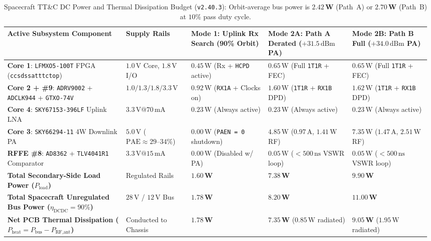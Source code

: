 \documentclass[10pt,a4paper]{article}
\renewcommand{\_}{\origunderscore\penalty0\hskip0pt\relax}
\numberwithin{equation}{section}
\numberwithin{table}{section}
\numberwithin{figure}{section}
\begin{document}
\begin{table}[htbp]
\centering
\scriptsize
\renewcommand{\arraystretch}{1.14}
\begin{tabularx}{\textwidth}{@{}L{0.27\textwidth} L{0.15\textwidth} L{0.17\textwidth} L{0.17\textwidth} Y@{}}
  \toprule
  \textbf{Active Subsystem Component} & \textbf{Supply Rails} & \textbf{Mode 1: Uplink Rx Search (90\% Orbit)} & \textbf{Mode 2A: Path A Derated ($+31.5\,\text{dBm}$ PA)} & \textbf{Mode 2B: Path B Full ($+34.0\,\text{dBm}$ PA)} \\
  \midrule
  \textbf{Core 1}: \texttt{LFMXO5-100T} FPGA (\texttt{ccsds\_sat\_ttc\_top}) & $1.0\,\text{V}$ Core, $1.8\,\text{V}$ I/O & $0.45\,\text{W}$ (Rx + \texttt{HCPD} active) & $0.65\,\text{W}$ (Full \texttt{1T1R} + FEC) & $0.65\,\text{W}$ (Full \texttt{1T1R} + FEC) \\
  \textbf{Core 2 + \#9}: \texttt{ADRV9002} + \texttt{ADCLK944} + \texttt{GTXO-74V} & $1.0 / 1.3 / 1.8 / 3.3\,\text{V}$ & $0.92\,\text{W}$ (\texttt{RX1A} + Clocks on) & $1.60\,\text{W}$ (\texttt{1T1R} + \texttt{RX1B} DPD) & $1.62\,\text{W}$ (\texttt{1T1R} + \texttt{RX1B} DPD) \\
  \textbf{Core 4}: \texttt{SKY67153-396LF} Uplink LNA & $3.3\,\text{V} @ 70\,\text{mA}$ & $0.23\,\text{W}$ (Always active) & $0.23\,\text{W}$ (Always active) & $0.23\,\text{W}$ (Always active) \\
  \textbf{Core 3}: \texttt{SKY66294-11} 4W Downlink PA & $5.0\,\text{V}$ ($\text{PAE} \approx 29\text{--}34\%$) & $0.00\,\text{W}$ (\texttt{PAEN = 0} shutdown) & $4.85\,\text{W}$ ($0.97\,\text{A}$, $1.41\,\text{W}$ RF) & $7.35\,\text{W}$ ($1.47\,\text{A}$, $2.51\,\text{W}$ RF) \\
  \textbf{RFFE \#8}: \texttt{AD8362} + \texttt{TLV4041R1} Comparator & $3.3\,\text{V} @ 15\,\text{mA}$ & $0.00\,\text{W}$ (Disabled w/ PA) & $0.05\,\text{W}$ ($<500\,\text{ns}$ VSWR loop) & $0.05\,\text{W}$ ($<500\,\text{ns}$ VSWR loop) \\
  \midrule
  \textbf{Total Secondary-Side Load Power ($P_{\text{load}}$)} & Regulated Rails & $\mathbf{1.60\,\text{W}}$ & $\mathbf{7.38\,\text{W}}$ & $\mathbf{9.90\,\text{W}}$ \\
  \textbf{Total Spacecraft Unregulated Bus Power ($\eta_{\text{DCDC}}=90\%$)} & $28\,\text{V}$ / $12\,\text{V}$ Bus & $\mathbf{1.78\,\text{W}}$ & $\mathbf{8.20\,\text{W}}$ & $\mathbf{11.00\,\text{W}}$ \\
  \textbf{Net PCB Thermal Dissipation ($P_{\text{heat}} = P_{\text{bus}} - P_{\text{RF,ant}}$)} & Conducted to Chassis & $\mathbf{1.78\,\text{W}}$ & $\mathbf{7.35\,\text{W}}$ ($0.85\,\text{W}$ radiated) & $\mathbf{9.05\,\text{W}}$ ($1.95\,\text{W}$ radiated) \\
  \bottomrule
\end{tabularx}
\caption{\footnotesize Spacecraft TT\&C DC Power and Thermal Dissipation Budget (\texttt{v2.40.3}): Orbit-average bus power is $\mathbf{2.42\,\text{W}}$ (Path~A) or $\mathbf{2.70\,\text{W}}$ (Path~B) at $10\%$ pass duty cycle.}
\end{table}
\end{document}
